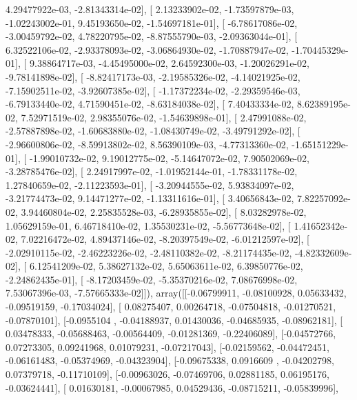 \documentclass{article}
\begin{document}
          4.29477922e-03,  -2.81343314e-02],
       [  2.13233902e-02,  -1.73597879e-03,  -1.02243002e-01,
          9.45193650e-02,  -1.54697181e-01],
       [ -6.78617086e-02,  -3.00459792e-02,   4.78220795e-02,
         -8.87555790e-03,  -2.09363044e-01],
       [  6.32522106e-02,  -2.93378093e-02,  -3.06864930e-02,
         -1.70887947e-02,  -1.70445329e-01],
       [  9.38864717e-03,  -4.45495000e-02,   2.64592300e-03,
         -1.20026291e-02,  -9.78141898e-02],
       [ -8.82417173e-03,  -2.19585326e-02,  -4.14021925e-02,
         -7.15902511e-02,  -3.92607385e-02],
       [ -1.17372234e-02,  -2.29359546e-03,  -6.79133440e-02,
          4.71590451e-02,  -8.63184038e-02],
       [  7.40433334e-02,   8.62389195e-02,   7.52971519e-02,
          2.98355076e-02,  -1.54639898e-01],
       [  2.47991088e-02,  -2.57887898e-02,  -1.60683880e-02,
         -1.08430749e-02,  -3.49791292e-02],
       [ -2.96600806e-02,  -8.59913802e-02,   8.56390109e-03,
         -4.77313360e-02,  -1.65151229e-01],
       [ -1.99010732e-02,   9.19012775e-02,  -5.14647072e-02,
          7.90502069e-02,  -3.28785476e-02],
       [  2.24917997e-02,  -1.01952144e-01,  -1.78331178e-02,
          1.27840659e-02,  -2.11223593e-01],
       [ -3.20944555e-02,   5.93834097e-02,  -3.21774473e-02,
          9.14471277e-02,  -1.13311616e-01],
       [  3.40656843e-02,   7.82257092e-02,   3.94460804e-02,
          2.25835528e-03,  -6.28935855e-02],
       [  8.03282978e-02,   1.05629159e-01,   6.46718410e-02,
          1.35530231e-02,  -5.56773648e-02],
       [  1.41652342e-02,   7.02216472e-02,   4.89437146e-02,
         -8.20397549e-02,  -6.01212597e-02],
       [ -2.02910115e-02,  -2.46223226e-02,  -2.48110382e-02,
         -8.21174435e-02,  -4.82332609e-02],
       [  6.12541209e-02,   5.38627132e-02,   5.65063611e-02,
          6.39850776e-02,  -2.24862435e-01],
       [ -8.17203459e-02,  -5.35370216e-02,   7.08676998e-02,
          7.53067396e-03,  -7.57665333e-02]]), array([[-0.06799911, -0.08100928,  0.05633432, -0.09519159, -0.17034024],
       [ 0.08275407,  0.00264718, -0.07504818, -0.01270521, -0.07870101],
       [-0.0955104 , -0.04188937,  0.01430036, -0.04685935, -0.08962181],
       [ 0.03478333, -0.05688463, -0.00564409, -0.01281369, -0.22406089],
       [-0.04572766,  0.07273305,  0.09241968,  0.01079231, -0.07217043],
       [-0.02159562, -0.04472451, -0.06161483, -0.05374969, -0.04323904],
       [-0.09675338,  0.0916609 , -0.04202798,  0.07379718, -0.11710109],
       [-0.00963026, -0.07469706,  0.02881185,  0.06195176, -0.03624441],
       [ 0.01630181, -0.00067985,  0.04529436, -0.08715211, -0.05839996],
\end{document}
